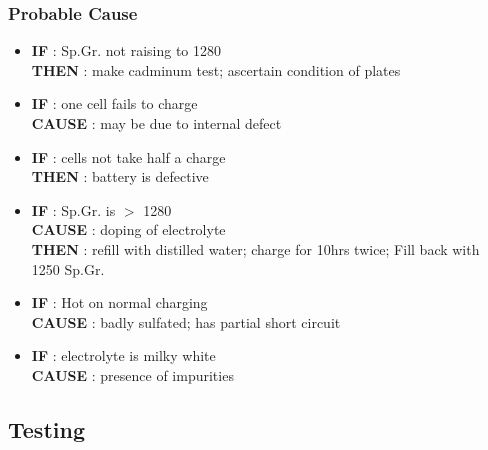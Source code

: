 \documentclass{beamer}
\begin{document}
\begin{frame}     %
  \frametitle{Probable Cause}
  \fontsize{7pt}{14}\selectfont
  \begin{itemize}
    \item \textbf{IF} : Sp.Gr. not raising to 1280  \\ \textbf{THEN} : make cadminum test; ascertain condition of plates 
    \item \textbf{IF} : one cell fails to charge \\ \textbf{CAUSE} : may be due to internal defect 
    \item \textbf{IF} : cells not take half a charge \\ \textbf{THEN} : battery is defective
    \item \textbf{IF} : Sp.Gr. is $>$ 1280 \\ \textbf{CAUSE} : doping of electrolyte  \\ \textbf{THEN} : refill with distilled water; charge for 10hrs twice; Fill back with 1250 Sp.Gr.
    \item \textbf{IF} : Hot on normal charging \\ \textbf{CAUSE} : badly sulfated; has partial short circuit 
    \item \textbf{IF} : electrolyte is milky white \\ \textbf{CAUSE} : presence of impurities 
  \end{itemize}
\end{frame}



\subsection{Testing}            %

{ %
    \begin{frame}[plain]
     \end{frame}
}
\end{document}
